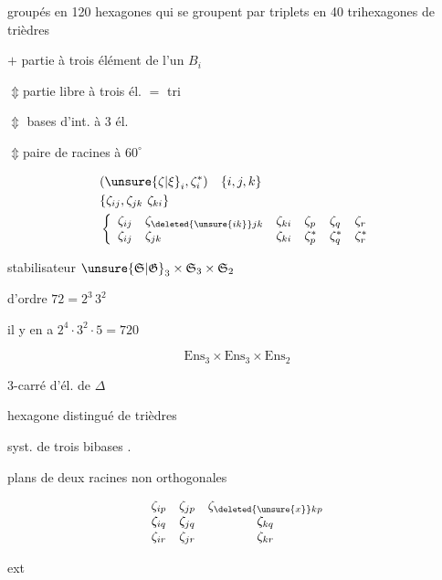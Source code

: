  groupés en 120 hexagones qui se groupent par triplets en 40 trihexagones de trièdres

  $+$ partie à trois élément de l'un $B_i$

$\Updownarrow$\quad partie libre à trois él. $=$ tri

$\Updownarrow$\quad {}  bases d'int.  à 3 él.

$\Updownarrow$\quad paire de racines à $60^\circ$

\[
 \begin{aligned}
 &(\unsure{\zeta|\xi}_i,\zeta_i^*)\quad\{i,j,k\}\\
 &\{\zeta_{ij},\zeta_{jk}\ \zeta_{ki}\}\\
 &\left\{\begin{array}{llllll}
 \zeta_{ij}&\zeta_{\deleted{\unsure{ik}}jk}&\zeta_{ki}&\zeta_p&\zeta_q&\zeta_r\\
 \zeta_{ij}&\zeta_{jk}&\zeta_{ki}&\zeta_p^*&\zeta_q^*&\zeta_r^*
 \end{array}\right.
 \end{aligned}
\]

stabilisateur $\unsure{\mathfrak S|\mathfrak G}_3\times\mathfrak S_3\times\mathfrak S_2$

d'ordre $72=2^3\,3^2$

il y en a $2^4\cdot3^2\cdot5=720$

\[
 \mathrm{Ens}_3\times\mathrm{Ens}_3\times\mathrm{Ens}_2
\]

 3-carré d'él. de $\Delta$

hexagone distingué de trièdres

syst. de trois bibases  .

plans de deux racines non orthogonales

\[
 \begin{matrix}
 \zeta_{ip}&\zeta_{jp}&\zeta_{\deleted{\unsure{x}}kp}\\
 \zeta_{iq}&\zeta_{jq}&\zeta_{kq}\\
 \zeta_{ir}&\zeta_{jr}&\zeta_{kr}
 \end{matrix}
\]

ext

